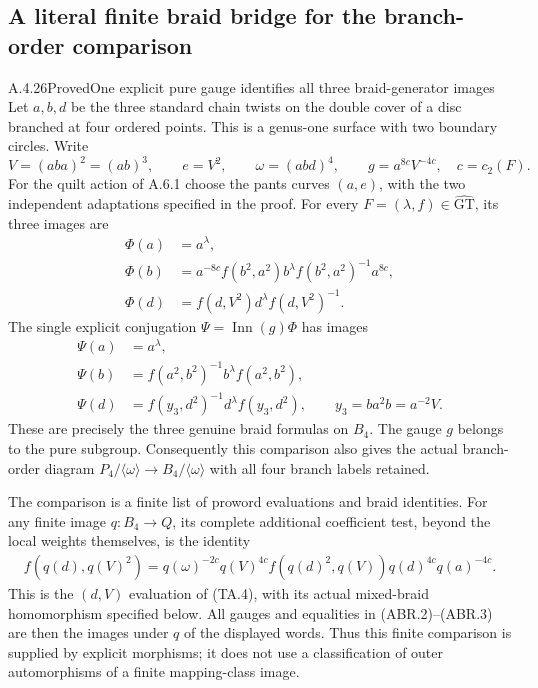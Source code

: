 \subsection{A literal finite braid bridge for the branch-order comparison}

\begin{result}{A.4.26}{Proved}{One explicit pure gauge identifies all three braid-generator images}
Let $a,b,d$ be the three standard chain twists on the double
cover of a disc branched at four ordered points.  This is a genus-one
surface with two boundary circles.  Write
\[
 V=(aba)^2=(ab)^3,\qquad e=V^2,\qquad
 \omega=(abd)^4,
 \qquad g=a^{8c}V^{-4c},\quad c=c_2(F).                  \tag{ABR.1}
\]
For the quilt action of A.6.1 choose the pants curves $(a,e)$,
with the two independent adaptations specified in the proof.
For every $F=(\lambda,f)\in\widehat{\mathrm{GT}}$, its three
images are
\[
\begin{aligned}
 \Phi(a)&=a^\lambda,\\
 \Phi(b)&=a^{-8c}f(b^2,a^2)b^\lambda
                         f(b^2,a^2)^{-1}a^{8c},\\
 \Phi(d)&=f(d,V^2)d^\lambda f(d,V^2)^{-1}.
\end{aligned}                                                    \tag{ABR.2}
\]
The single explicit conjugation $\Psi=\operatorname{Inn}(g)\Phi$
has images
\[
\begin{aligned}
 \Psi(a)&=a^\lambda,\\
 \Psi(b)&=f(a^2,b^2)^{-1}b^\lambda f(a^2,b^2),\\
 \Psi(d)&=f(y_3,d^2)^{-1}d^\lambda f(y_3,d^2),
 \qquad y_3=ba^2b=a^{-2}V.
\end{aligned}                                                    \tag{ABR.3}
\]
These are precisely the three genuine braid formulas on $B_4$.
The gauge $g$ belongs to the pure subgroup.  Consequently this
comparison also gives the actual branch-order diagram
$P_4/\langle\omega\rangle\to B_4/\langle\omega\rangle$
with all four branch labels retained.

The comparison is a finite list of proword evaluations and braid
identities.  For any finite image $q:B_4\to Q$, its complete
additional coefficient test, beyond the local weights themselves,
is the identity
\[
\begin{split}
 f(q(d),q(V)^2)
   =q(\omega)^{-2c}q(V)^{4c}
       f(q(d)^2,q(V))q(d)^{4c}q(a)^{-4c}.
\end{split}                                                     \tag{ABR.4}
\]
This is the $(d,V)$ evaluation of (TA.4), with its actual
mixed-braid homomorphism specified below.  All gauges and
equalities in (ABR.2)--(ABR.3) are then the images under $q$ of
the displayed words.  Thus this finite comparison is supplied
by explicit morphisms; it does not use a classification of
outer automorphisms of a finite mapping-class image.
\end{result}

